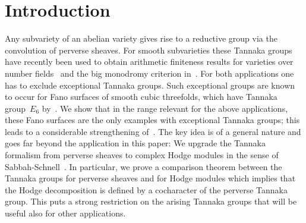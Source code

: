 \documentclass[a4paper]{amsart}
\theoremstyle{plain}
\theoremstyle{definition}
\numberwithin{equation}{section}
\begin{document}
\maketitle

\setcounter{tocdepth}{1}

\tableofcontents


\thispagestyle{empty}


\section{Introduction} 

Any subvariety of an abelian variety gives rise to a reductive group via the convolution of perverse sheaves. For smooth subvarieties these Tannaka groups have recently been used to obtain arithmetic finiteness results for varieties over number fields~\cite{LS20,KM} and the big monodromy criterion in~\cite{JKLM}. For both applications one has to exclude exceptional Tannaka groups. Such exceptional groups are known to occur for Fano surfaces of smooth cubic threefolds, which have Tannaka group~$E_6$ by~\cite{KraemerCubicThreefolds}. We show that in the range relevant for the above applications, these Fano surfaces are the only examples with exceptional Tannaka groups; this leads to a considerable strengthening of~\cite{KM, JKLM}. The key 
%
idea is of a general nature and goes far beyond the application in this paper: We upgrade the Tannaka formalism from perverse sheaves to complex Hodge modules in the sense of Sabbah-Schnell~\cite{MHMProject}. 
%
In particular, we prove a comparison theorem between the Tannaka groups for perverse sheaves and for Hodge modules which implies that the Hodge decomposition is defined by a cocharacter of the perverse Tannaka group. This puts a strong restriction on the arising Tannaka groups 
that will be useful also for other applications. 
\end{document}
